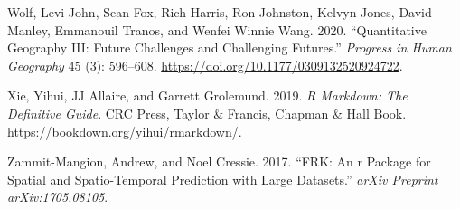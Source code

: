 \documentclass[
  letterpaper,
  krantz2]{style/krantz}
\newlength{\cslhangindent}
\newlength{\cslentryspacingunit} %
\newenvironment{CSLReferences}[2] %
 {%
  \setlength{\parindent}{0pt}
  \ifodd #1
  \let\oldpar\par
  \def\par{\hangindent=\cslhangindent\oldpar}
  \fi
  \setlength{\parskip}{#2\cslentryspacingunit}
 }%
 {}
\begin{document}
\begin{CSLReferences}{1}{0}
\leavevmode{}%
Wolf, Levi John, Sean Fox, Rich Harris, Ron Johnston, Kelvyn Jones,
David Manley, Emmanouil Tranos, and Wenfei Winnie Wang. 2020.
{``Quantitative Geography III: Future Challenges and Challenging
Futures.''} \emph{Progress in Human Geography} 45 (3): 596--608.
\url{https://doi.org/10.1177/0309132520924722}.

\leavevmode{}%
Xie, Yihui, JJ Allaire, and Garrett Grolemund. 2019. \emph{R Markdown:
The Definitive Guide}. CRC Press, Taylor \& Francis, Chapman \& Hall
Book. \url{https://bookdown.org/yihui/rmarkdown/}.

\leavevmode{}%
Zammit-Mangion, Andrew, and Noel Cressie. 2017. {``FRK: An r Package for
Spatial and Spatio-Temporal Prediction with Large Datasets.''}
\emph{arXiv Preprint arXiv:1705.08105}.

\end{CSLReferences}



\printindex
\end{document}
